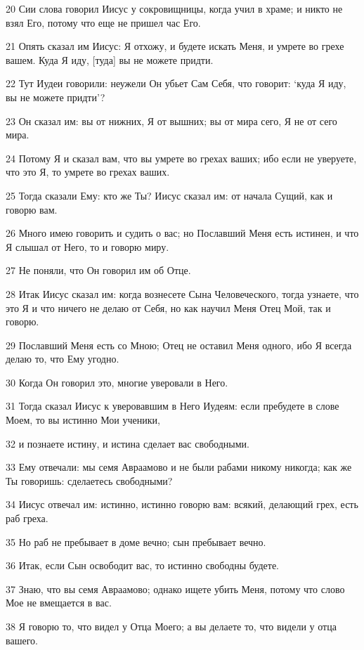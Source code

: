\par 20 Сии слова говорил Иисус у сокровищницы, когда учил в храме; и никто не взял Его, потому что еще не пришел час Его.
\par 21 Опять сказал им Иисус: Я отхожу, и будете искать Меня, и умрете во грехе вашем. Куда Я иду, [туда] вы не можете придти.
\par 22 Тут Иудеи говорили: неужели Он убьет Сам Себя, что говорит: `куда Я иду, вы не можете придти'?
\par 23 Он сказал им: вы от нижних, Я от вышних; вы от мира сего, Я не от сего мира.
\par 24 Потому Я и сказал вам, что вы умрете во грехах ваших; ибо если не уверуете, что это Я, то умрете во грехах ваших.
\par 25 Тогда сказали Ему: кто же Ты? Иисус сказал им: от начала Сущий, как и говорю вам.
\par 26 Много имею говорить и судить о вас; но Пославший Меня есть истинен, и что Я слышал от Него, то и говорю миру.
\par 27 Не поняли, что Он говорил им об Отце.
\par 28 Итак Иисус сказал им: когда вознесете Сына Человеческого, тогда узнаете, что это Я и что ничего не делаю от Себя, но как научил Меня Отец Мой, так и говорю.
\par 29 Пославший Меня есть со Мною; Отец не оставил Меня одного, ибо Я всегда делаю то, что Ему угодно.
\par 30 Когда Он говорил это, многие уверовали в Него.
\par 31 Тогда сказал Иисус к уверовавшим в Него Иудеям: если пребудете в слове Моем, то вы истинно Мои ученики,
\par 32 и познаете истину, и истина сделает вас свободными.
\par 33 Ему отвечали: мы семя Авраамово и не были рабами никому никогда; как же Ты говоришь: сделаетесь свободными?
\par 34 Иисус отвечал им: истинно, истинно говорю вам: всякий, делающий грех, есть раб греха.
\par 35 Но раб не пребывает в доме вечно; сын пребывает вечно.
\par 36 Итак, если Сын освободит вас, то истинно свободны будете.
\par 37 Знаю, что вы семя Авраамово; однако ищете убить Меня, потому что слово Мое не вмещается в вас.
\par 38 Я говорю то, что видел у Отца Моего; а вы делаете то, что видели у отца вашего.
